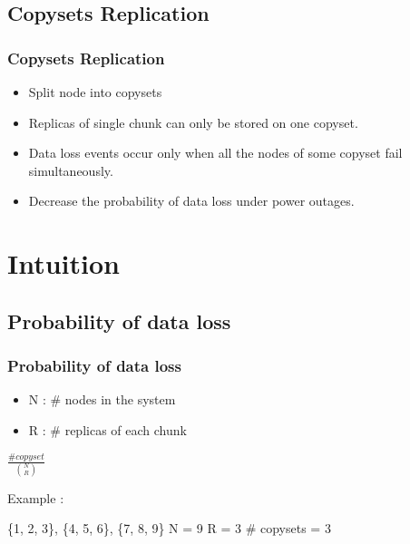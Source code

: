 \documentclass[xcolor=table]{beamer}
\begin{document}
	\subsection{Copysets Replication}
	\begin{frame}
		\frametitle{Copysets Replication}
		\begin{itemize}
			\item Split node into \alert{copysets}
			\item Replicas of single chunk can only be stored on \alert{one copyset}.
			\item Data loss events occur only when all the nodes of some copyset fail \alert{simultaneously}.
			\item \alert{Decrease} the probability of data loss under power outages.
		\end{itemize}
	\end{frame}

	\section{Intuition}

	\subsection{Probability of data loss}
	\begin{frame}
		\frametitle{Probability of data loss}
		\begin{minipage}[h]{0.49\linewidth}
			\centering
			\small
			\begin{itemize}
				\item N : \# nodes in the system
				\item R : \# replicas of each chunk
			\end{itemize}
		\end{minipage}
		\begin{minipage}[h]{0.49\linewidth}
			\centering
			\Huge
			$\frac{\# copyset}{\binom{N}{R}}$
		\end{minipage}
		\newline
		\newline
		Example :
		\begin{center}
			\alert{\{1, 2, 3\}, \{4, 5, 6\}, \{7, 8, 9\}}
			\newline
			\newline
			N = 9\newline
			R = 3
			\newline
			\newline
			\# copysets = 3
			\newline
		\end{center}
	\end{frame}
\end{document}

